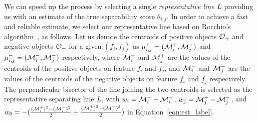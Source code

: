  We can speed up the process by selecting a single {\em representative line} $\mathit{L}$ providing us with an estimate of the true separability score $\theta_{i, j}$.
In order to achieve a fast and reliable estimate, we select our representative line based on Rocchio's algorithm~\cite{rocchio1971relevance}, as follows.
Let us denote the centroids of positive objects ${\mathcal{O}}_+$ and negative objects ${\mathcal{O}}_-$ for a given $(f_i,f_j)$ as $\mu_{i,j}^+=({\mathcal{M}}_i^+,{\mathcal{M}}_j^+)$ and $\mu_{i,j}^-=({\mathcal{M}}_i^-,{\mathcal{M}}_j^-)$ respectively, where ${\mathcal{M}}_i^+$ and ${\mathcal{M}}_j^+$ are the values of the centroids of the positive objects on feature $f_i$ and $f_j$, and ${\mathcal{M}}_i^-$ and ${\mathcal{M}}_j^-$ are the values of the centroids of the negative objects on feature $f_i$ and $f_j$ respectively. The perpendicular bisector of the line joining the two centroids is selected as the representative separating line $\mathit{L}$, with {\small $w_i = {\mathcal{M}}_i^+-{\mathcal{M}}_i^-$}, {\small $w_j = {\mathcal{M}}_j^+-{\mathcal{M}}_j^-$}, and {\small $w_0 = -(\frac{({\mathcal{M}}_i^+)^2-({\mathcal{M}}_i^-)^2}{2}+\frac{({\mathcal{M}}_j^+)^2-({\mathcal{M}}_j^-)^2}{2})$} in Equation~\ref{eqn:est_label}.

